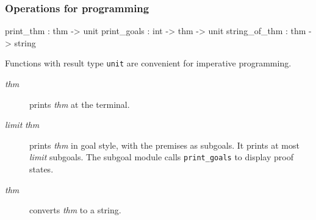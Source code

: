 \subsubsection{Operations for programming}
\begin{ttbox} 
print_thm     : thm -> unit
print_goals   : int -> thm -> unit
string_of_thm : thm -> string
\end{ttbox}
Functions with result type {\tt unit} are convenient for imperative
programming.
\begin{description}
\item[ {\it thm}]  
prints {\it thm\/} at the terminal.

\item[ {\it limit\/} {\it thm}]  
prints {\it thm\/} in goal style, with the premises as subgoals.  It prints
at most {\it limit\/} subgoals.  The subgoal module calls {\tt print_goals}
to display proof states.

\item[ {\it thm}]  
converts {\it thm\/} to a string.
\end{description}


